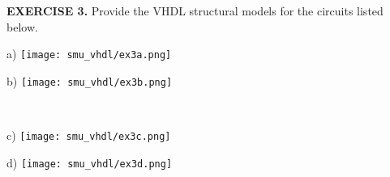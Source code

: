 \vspace{20pt}
\noindent
\begin{minipage}{\textwidth}
\textbf{EXERCISE 3.}
Provide the VHDL structural models for the circuits listed below.

\vspace{7pt}
\begin{minipage}[b]{0.45\linewidth}
\centering
a)
\texttt{[image: smu\_vhdl/ex3a.png]}
\end{minipage}
\hspace{0.2cm}
\begin{minipage}[b]{0.5\linewidth}
\centering
b)
\texttt{[image: smu\_vhdl/ex3b.png]}
\end{minipage}\\

\vspace{7pt}
\begin{minipage}[b]{0.45\linewidth}
\centering
c)
\texttt{[image: smu\_vhdl/ex3c.png]}
\end{minipage}
\hspace{0.2cm}
\begin{minipage}[b]{0.5\linewidth}
\centering
d)
\texttt{[image: smu\_vhdl/ex3d.png]}
\end{minipage}
\end{minipage}
